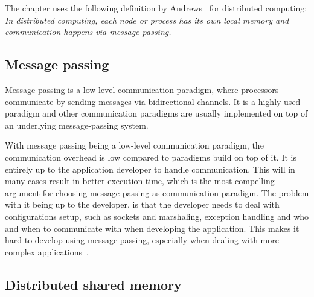 The chapter uses the following definition by Andrews~\cite{andrews2000foundations} for distributed computing: \textit{In distributed computing, each node or process has its own local memory and communication happens via message passing.}




%



\subsection{Message passing}

Message passing is a low-level communication paradigm, where processors communicate by sending messages via bidirectional channels. It is a highly used paradigm and other communication paradigms are usually implemented on top of an underlying message-passing system.  

With message passing being a low-level communication paradigm, the communication overhead is low compared to paradigms build on top of it. It is entirely up to the application developer to handle communication. This will in many cases result in better execution time, which is the most compelling argument for choosing message passing as communication paradigm. The problem with it being up to the developer, is that the developer needs to deal with configurations setup, such as sockets and marshaling, exception handling and who and when to communicate with when developing the application. This makes it hard to develop using message passing, especially when dealing with more complex applications~\cite{lu1995message}. 


\subsection{Distributed shared memory}\label{sec:DSM}

